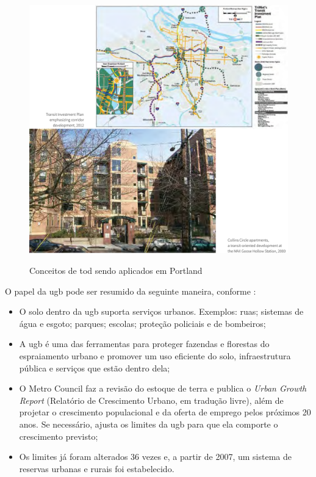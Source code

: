 	\begin{figure}
		\centering
		\caption{Conceitos de \gls{tod} sendo aplicados em Portland}
		\includegraphics[width=0.9\linewidth]{img/trimet2015a_01}
		\label{fig:todtrimet}
	\end{figure}

	O papel da \gls{ugb} pode ser resumido da seguinte maneira, conforme \cite{metro2019a}:

	\begin{itemize}
		\item O solo dentro da \gls{ugb} suporta serviços urbanos. Exemplos: ruas; sistemas de água e esgoto; parques; escolas; proteção policiais e de bombeiros;
		\item A \gls{ugb} é uma das ferramentas para proteger fazendas e florestas do espraiamento urbano e promover um uso eficiente do solo, infraestrutura pública e serviços que estão dentro dela;
		\item O Metro Council faz a revisão do estoque de terra e publica o \textit{Urban Growth Report} (Relatório de Crescimento Urbano, em tradução livre), além de projetar o crescimento populacional e da oferta de emprego pelos próximos 20 anos. Se necessário, ajusta os limites da \gls{ugb} para que ela comporte o crescimento previsto;
		\item Os limites já foram alterados 36 vezes e, a partir de 2007, um sistema de reservas urbanas e rurais foi estabelecido.
	\end{itemize}
	
